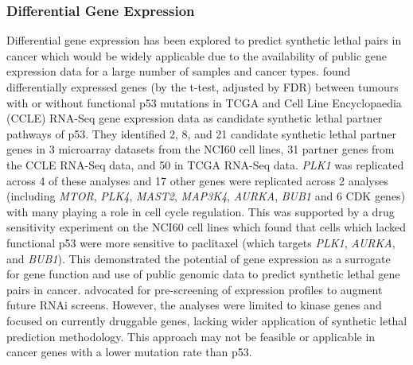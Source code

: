 \subsubsection{Differential Gene Expression}

Differential gene expression has been explored to predict synthetic lethal pairs in cancer which would be widely applicable due to the availability of public gene expression data for a large number of samples and cancer types. \citet{Wang2013} found differentially expressed genes (by the t-test, adjusted by FDR) between tumours with or without functional p53 mutations in TCGA \citep{TCGA2008GBM} and Cell Line Encyclopaedia (CCLE) RNA-Seq gene expression data as candidate synthetic lethal partner pathways of p53. They identified 2, 8, and 21 candidate synthetic lethal partner genes in 3 microarray datasets from the NCI60 cell lines, 31 partner genes from the CCLE RNA-Seq data, and 50 in TCGA RNA-Seq data. \textit{PLK1} was replicated across 4 of these analyses and 17 other genes were replicated across 2 analyses (including \textit{MTOR}, \textit{PLK4}, \textit{MAST2}, \textit{MAP3K4}, \textit{AURKA}, \textit{BUB1} and 6 CDK genes) with many playing a role in cell cycle regulation. This was supported by a drug sensitivity experiment on the NCI60 cell lines which found that cells which lacked functional p53 were more sensitive to paclitaxel (which targets \textit{PLK1}, \textit{AURKA}, and \textit{BUB1}). This demonstrated the potential of gene expression as a surrogate for gene function and use of public genomic data to predict synthetic lethal gene pairs in cancer. \citet{Wang2013} advocated for pre-screening of expression profiles to augment future RNAi screens. However, the analyses were limited to kinase genes and focused on currently druggable genes, lacking wider application of synthetic lethal prediction methodology. This approach may not be feasible or applicable in cancer genes with a lower mutation rate than p53.  

